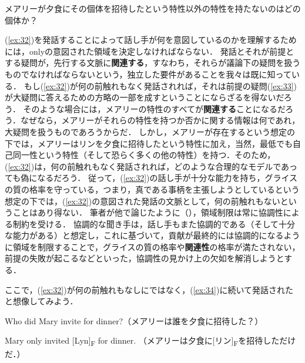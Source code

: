 \documentclass{goken}
\begin{document}
\begin{exe}
	\ex\label{ex:33} メアリーが夕食にその個体を招待したという特性以外の特性を持たないのはどの個体か？
\end{exe}

\noindent
(\ref{ex:32})を発話することによって話し手が何を意図しているのかを理解するためには，onlyの意図された領域を決定しなければならない．
発話とそれが前提とする疑問が，先行する文脈に\textbf{関連する}，すなわち，それらが議論下の疑問を扱うものでなければならないという，独立した要件があることを我々は既に知っている．
もし(\ref{ex:32})が何の前触れもなく発話されれば，それは前提の疑問(\ref{ex:33})が大疑問に答えるための方略の一部を成すということにならざるを得ないだろう．
そのような場合には，メアリーの特性のすべてが\textbf{関連する}ことになるだろう．なぜなら，メアリーがそれらの特性を持つか否かに関する情報は何であれ，大疑問を扱うものであろうからだ．
しかし，メアリーが存在するという想定の下では，メアリーはリンを夕食に招待したという特性に加え，当然，最低でも自己同一性という特性（そして恐らく多くの他の特性）を持つ．そのため，(\ref{ex:32})は，何の前触れもなく発話されれば，どのような合理的なモデルであっても偽になるだろう．
従って，(\ref{ex:32})の話し手が十分な能力を持ち，グライスの質の格率を守っている，つまり，真である事柄を主張しようとしているという想定の下では，(\ref{ex:32})の意図された発話の文脈として，何の前触れもないということはあり得ない．
筆者が他で論じたように（\citealt{Roberts1995,Roberts1996a}），領域制限は常に協調性による制約を受ける．
協調的な聞き手は，話し手もまた協調的である（そして十分な能力がある）と想定し，これに基づいて，貢献が最終的には協調的になるように領域を制限することで，グライスの質の格率や\textbf{関連性}の格率が満たされない，前提の失敗が起こるなどといった，協調性の見かけ上の欠如を解消しようとする．%

ここで，(\ref{ex:32})が何の前触れもなしにではなく，(\ref{ex:34})に続いて発話されたと想像してみよう．

\begin{exe}
	\ex\label{ex:34} Who did Mary invite for dinner?（メアリーは誰を夕食に招待した？）
\end{exe}

\setcounter{exx}{31}
\begin{exe}
	\ex\label{ex:re:32} Mary only invited [Lyn]\textsubscript{F} for dinner. （メアリーは夕食に[リン]\textsubscript{F}を招待しただけだ．）
\end{exe}
\end{document}
